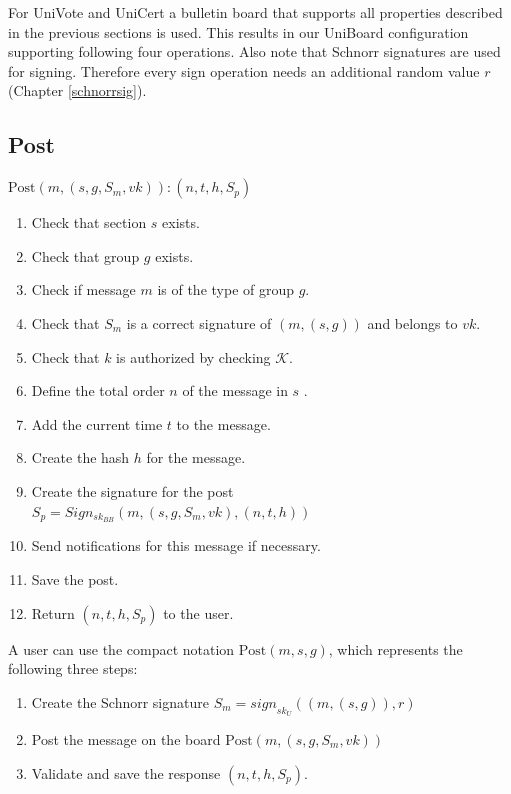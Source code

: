 \documentclass[bibtotoc,halfparskip,oneside]{scrreprt}
\begin{document}
	For UniVote and UniCert a bulletin board that supports all properties described in the previous sections is used. This results in our UniBoard configuration supporting following four operations. Also note that Schnorr signatures are used for signing. Therefore every sign operation needs an additional random value $r$ (Chapter \ref{schnorrsig}).
	
	\subsection{Post}
	$\mathrm{Post}(m, (s, g, S_m, vk)):(n, t , h, S_p)$
	\begin{enumerate}
		\item Check that section $s$ exists.
		\item Check that group $g$ exists.
		\item Check if message $m$ is of the type of group $g$.
		\item Check that $S_m$ is a correct signature of $(m, (s, g))$ and belongs to $vk$.
		\item Check that $k$ is authorized by checking $\mathcal{K}$.
		\item Define the total order $n$ of the message in $s$ .
		\item Add the current time $t$ to the message.
		\item Create the hash $h$ for the message.
		\item Create the signature for the post $S_p=Sign_{sk_{BB}}(m, (s, g, S_m , vk), (n, t, h))$
		\item Send notifications for this message if necessary.
		\item Save the post.
		\item Return $(n, t, h, S_p)$ to the user.
	\end{enumerate}
	
	A user can use the compact notation $\mathrm{Post}(m, s, g)$, which represents the following three steps:
	\begin{enumerate}
		\item Create the Schnorr signature $S_m=\mathit{sign}_{sk_U}((m,(s,g)),r)$
		\item Post the message on the board $\mathrm{Post}(m, (s, g, S_m, vk))$
		\item Validate and save the response $(n, t , h, S_p)$.
	\end{enumerate}
	
\end{document}
